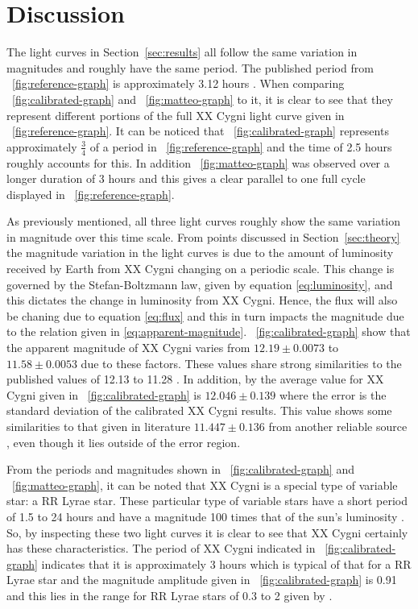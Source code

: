 \documentclass{article}
\newcommand{\figref}[2][\figurename~]{#1\ref{#2}}
\newcommand{\secref}[2][Section~]{#1\ref{#2}}
\begin{document}
\section{Discussion}
\label{sec:discussion}

The light curves in \secref{sec:results} all follow the same variation in magnitudes and roughly have the same period. The published period from \figref{fig:reference-graph} is approximately 3.12 hours \cite{Web04}. When comparing \figref{fig:calibrated-graph} and \figref{fig:matteo-graph} to it, it is clear to see that they represent different portions of the full XX Cygni light curve given in \figref{fig:reference-graph}. It can be noticed that \figref{fig:calibrated-graph} represents approximately $\frac{3}{4}$ of a period in \figref{fig:reference-graph} and the time of 2.5 hours roughly accounts for this. In addition \figref{fig:matteo-graph} was observed over a longer duration of 3 hours and this gives a clear parallel to one full cycle displayed in \figref{fig:reference-graph}.

\vspace{2mm}
\noindent
As previously mentioned, all three light curves roughly show the same variation in magnitude over this time scale. From points discussed in \secref{sec:theory} the magnitude variation in the light curves is due to the amount of luminosity received by Earth from XX Cygni changing on a periodic scale. This change is governed by the Stefan-Boltzmann law, given by equation \eqref{eq:luminosity}, and this dictates the change in luminosity from XX Cygni. Hence, the flux will also be chaning due to equation \eqref{eq:flux} and this in turn impacts the magnitude due to the relation given in \eqref{eq:apparent-magnitude}. \figref{fig:calibrated-graph} show that the apparent magnitude of XX Cygni varies from $12.19 \pm{0.0073}$ to $11.58 \pm{0.0053}$ due to these factors. These values share strong similarities to the published values of 12.13 to 11.28 \cite{Web04}. In addition, by the average value for XX Cygni given in \figref{fig:calibrated-graph} is $12.046 \pm{0.139}$ where the error is the standard deviation of the calibrated XX Cygni results. This value shows some similarities to that given in literature $11.447 \pm{0.136}$ from another reliable source \cite{Web03}, even though it lies outside of the error region. 

\vspace{2mm}
\noindent
From the periods and magnitudes shown in \figref{fig:calibrated-graph} and \figref{fig:matteo-graph}, it can be noted that XX Cygni is a special type of variable star: a RR Lyrae star. These particular type of variable stars have a short period of 1.5 to 24 hours and have a magnitude 100 times that of the sun's luminosity \cite{Book01}. So, by inspecting these two light curves it is clear to see that XX Cygni certainly has these characteristics. The period of XX Cygni indicated in \figref{fig:calibrated-graph} indicates that it is approximately 3 hours which is typical of that for a RR Lyrae star and the magnitude amplitude given in \figref{fig:calibrated-graph} is 0.91 and this lies in the range for RR Lyrae stars of 0.3 to 2 given by \cite{Web05}.
\end{document}
